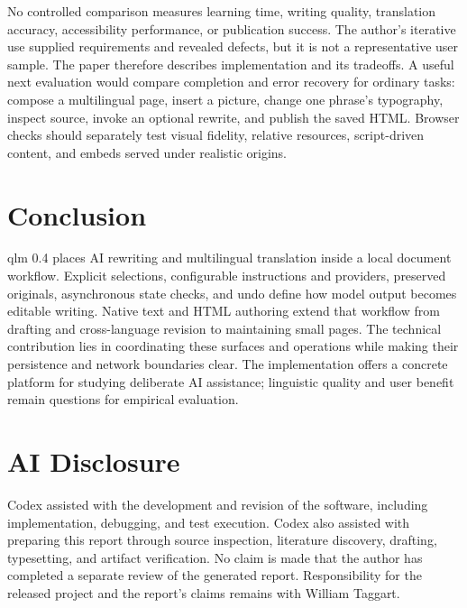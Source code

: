 \documentclass[manuscript,screen,nonacm]{acmart}
\begin{document}
No controlled comparison measures learning time, writing quality, translation accuracy, accessibility performance, or publication success. The author's iterative use supplied requirements and revealed defects, but it is not a representative user sample. The paper therefore describes implementation and its tradeoffs. A useful next evaluation would compare completion and error recovery for ordinary tasks: compose a multilingual page, insert a picture, change one phrase's typography, inspect source, invoke an optional rewrite, and publish the saved HTML. Browser checks should separately test visual fidelity, relative resources, script-driven content, and embeds served under realistic origins.

\section{Conclusion}

qlm 0.4 places AI rewriting and multilingual translation inside a local document workflow. Explicit selections, configurable instructions and providers, preserved originals, asynchronous state checks, and undo define how model output becomes editable writing. Native text and HTML authoring extend that workflow from drafting and cross-language revision to maintaining small pages. The technical contribution lies in coordinating these surfaces and operations while making their persistence and network boundaries clear. The implementation offers a concrete platform for studying deliberate AI assistance; linguistic quality and user benefit remain questions for empirical evaluation.

\section{AI Disclosure}

Codex assisted with the development and revision of the software, including implementation, debugging, and test execution. Codex also assisted with preparing this report through source inspection, literature discovery, drafting, typesetting, and artifact verification. No claim is made that the author has completed a separate review of the generated report. Responsibility for the released project and the report's claims remains with William Taggart.
\end{document}
